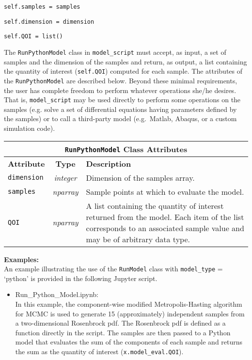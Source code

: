 \documentclass[./UsersGuide.tex]{subfiles}
\begin{document}
\hspace{1cm} \texttt{self.samples = samples}

\hspace{1cm} \texttt{self.dimension = dimension}

\hspace{1cm} \texttt{self.QOI = list()}
\vspace{4mm}

\noindent The \texttt{RunPythonModel} class in \texttt{model\_script} must accept, as input, a set of samples and the dimension of the samples and return, as output, a list containing the quantity of interest (\texttt{self.QOI}) computed for each sample. The attributes of the \texttt{RunPythonModel} are described below. Beyond these minimal requirements, the user has complete freedom to perform whatever operations she/he desires. That is, \texttt{model\_script} may be used directly to perform some operations on the samples (e.g. solve a set of differential equations having parameters defined by the samples) or to call a third-party model (e.g.\ Matlab, Abaqus, or a custom simulation code). 


\begin{center}
	\begin{tabular}{ |l|c|l| } 
				\hline
		\multicolumn{3}{|c|}{\texttt{RunPythonModel} Class Attributes} \\
		\hline
		\textbf{Attribute} & \textbf{Type} & \textbf{Description}  \\
		\hline
		\texttt{dimension} & {\it integer} & Dimension of the samples array. \\ 
		\hline
		\texttt{samples} & {\it nparray} & Sample points at which to evaluate the model. \\ 
		\hline
		\texttt{QOI} & {\it nparray} & A list containing the quantity of interest returned from the model. Each item of the list corresponds to an associated sample value and may be of arbitrary data type.  \\ 
		\hline
	\end{tabular}%
\end{center}

\noindent\textbf{Examples:}\\
\noindent An example illustrating the use of the \texttt{RunModel} class with \texttt{model\_type} = `python' is provided in the following Jupyter script.
\begin{itemize}
\item Run\_Python\_Model.ipynb:\\
	In this example, the component-wise modified Metropolis-Hasting algorithm for MCMC is used to generate 15 (approximately) independent samples from a two-dimensional Rosenbrock pdf. The Rosenbrock pdf is defined as a function directly in the script. The samples are then passed to a Python model that evaluates the sum of the components of each sample and returns the sum as the quantity of interest (\texttt{x.model\_eval.QOI}).
\end{itemize}
\end{document}
